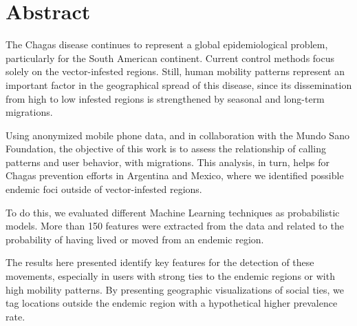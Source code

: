 \chapter{Abstract}
\label{cha:abstract}

The Chagas disease continues to represent a global epidemiological problem, particularly for the South American continent.
Current control methods focus solely on the vector-infested regions. 
Still, human mobility patterns represent an important factor in the geographical spread of this disease, since its dissemination from high to low infested regions is strengthened by seasonal and long-term migrations. 

Using anonymized mobile phone data, and in collaboration with the Mundo Sano Foundation, the objective of this work is to assess the relationship of calling patterns and user behavior, with migrations. 
This analysis, in turn, helps for Chagas prevention efforts in Argentina and Mexico, where we identified possible endemic foci outside of vector-infested regions. 

To do this, we evaluated different Machine Learning techniques as probabilistic models. 
More than 150 features were extracted from the data and related to the probability of having lived or moved from an endemic region. 

The results here presented identify key features for the detection of these movements, especially in users with strong ties to the endemic regions or with high mobility patterns. 
By presenting geographic visualizations of social ties, we tag locations outside the endemic region with a hypothetical higher prevalence rate.
